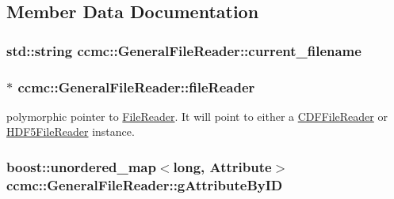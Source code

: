 \subsection{Member Data Documentation}
\hypertarget{classccmc_1_1_general_file_reader_a5ccab7d8bd4672ee5d6210288d5f41bd}{
\subsubsection[{current\-\_\-filename}]{\setlength{\rightskip}{0pt plus 5cm}std\-::string ccmc\-::\-General\-File\-Reader\-::current\-\_\-filename\hspace{0.3cm}{\ttfamily [protected]}}}\label{classccmc_1_1_general_file_reader_a5ccab7d8bd4672ee5d6210288d5f41bd}
\hypertarget{classccmc_1_1_general_file_reader_a255d7c592bd3908186af70794f05c0ea}{
\subsubsection[{file\-Reader}]{$\ast$ ccmc\-::\-General\-File\-Reader\-::file\-Reader\hspace{0.3cm}{\ttfamily [protected]}}}\label{classccmc_1_1_general_file_reader_a255d7c592bd3908186af70794f05c0ea}
polymorphic pointer to \hyperlink{classccmc_1_1_file_reader}{File\-Reader}. It will point to either a \hyperlink{classccmc_1_1_c_d_f_file_reader}{C\-D\-F\-File\-Reader} or \hyperlink{classccmc_1_1_h_d_f5_file_reader}{H\-D\-F5\-File\-Reader} instance. \hypertarget{classccmc_1_1_general_file_reader_a395e6335be8a0c569489a9635f6b9252}{
\subsubsection[{g\-Attribute\-By\-I\-D}]{\setlength{\rightskip}{0pt plus 5cm}boost\-::unordered\-\_\-map$<$long, {\bf Attribute}$>$ ccmc\-::\-General\-File\-Reader\-::g\-Attribute\-By\-I\-D\hspace{0.3cm}{\ttfamily [protected]}}}\label{classccmc_1_1_general_file_reader_a395e6335be8a0c569489a9635f6b9252}
